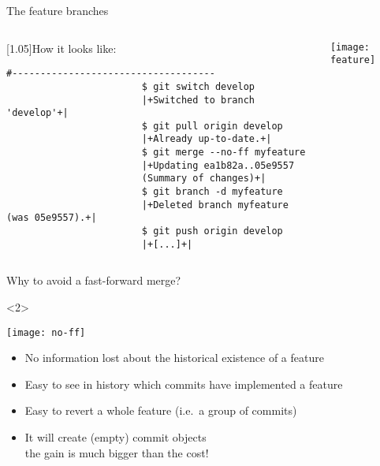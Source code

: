 \documentclass[usenames,svgnames,14pt]{beamer}
\renewcommand{\checkmark}[1][PP]{\textcolor{#1}{\ding{51}}}
\newcommand{\crossmark}[1][PT]{\textcolor{#1}{\ding{55}}}
\begin{document}
\begin{frame}[fragile,c]{The feature branches}
\begin{columns}[c]
\begin{column}{0.65\textwidth}
\begin{overlayarea}{\textwidth}{0.75\textheight}
\begin{varblock}{}[1.05\textwidth]{How it looks like:}
\begin{lstlisting}[style=MyBash]
                        #------------------------------------
                        $ git switch develop
                        |+Switched to branch 'develop'+|
                        $ git pull origin develop
                        |+Already up-to-date.+|
                        $ git merge --no-ff myfeature
                        |+Updating ea1b82a..05e9557
                        (Summary of changes)+|
                        $ git branch -d myfeature
                        |+Deleted branch myfeature (was 05e9557).+|
                        $ git push origin develop
                        |+[...]+|
                    \end{lstlisting}
                \end{varblock}
            \end{overlayarea}
        \end{column}
        \begin{column}{0.3\textwidth}
            \centerline{\texttt{[image: feature]}}
        \end{column}
    \end{columns}
\end{frame}
\begin{frame}[c]{Why to avoid a fast-forward merge?}
    \begin{onlyenv}<2>
        \vspace{-8mm}
        \begin{center}
            \texttt{[image: no-ff]}
        \end{center}
        \setlength{\leftmargini}{7mm}
        \begin{itemize}
            \setlength{\itemsep}{2mm}
            \item[\checkmark] No information lost about the historical existence of a feature
            \item[\checkmark] Easy to see in history which commits have implemented a feature
            \item[\checkmark] Easy to revert a whole feature (i.e.\ a group of commits)
            \item[\crossmark] It will create (empty) commit objects\\
                              \then the gain is much bigger than the cost!
        \end{itemize}
    \end{onlyenv}
\end{frame}
\end{document}
